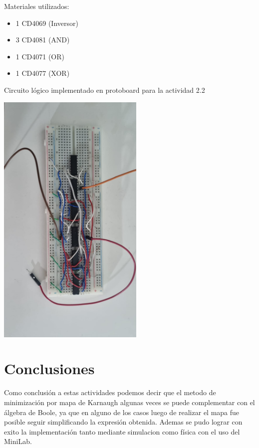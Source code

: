     Materiales utilizados:
    \begin{itemize}
        \item 1 CD4069 (Inversor)
        \item 3 CD4081 (AND)
        \item 1 CD4071 (OR)
        \item 1 CD4077 (XOR)
    \end{itemize}
Circuito lógico implementado en protoboard para la actividad 2.2
    \begin{center}
    \includegraphics[width=7cm]{imagenes/Circuito2.jpg}
    \end{center}

    \section{Conclusiones}

    Como conclusión a estas actividades podemos decir que el metodo de minimización por mapa de Karnaugh algunas veces se puede complementar con el álgebra de Boole, ya que en alguno de los casos luego de realizar el mapa fue posible seguir simplificando la expresión obtenida. Ademas se pudo lograr con exito la implementación tanto mediante simulacion como física con el uso del MiniLab.
    
